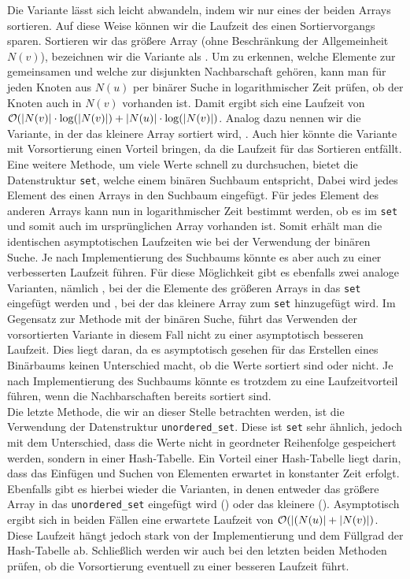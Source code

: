 Die Variante \SorSor{} lässt sich leicht abwandeln, indem wir nur eines der beiden Arrays sortieren.
Auf diese Weise können wir die Laufzeit des einen Sortiervorgangs sparen. Sortieren
wir das größere Array (ohne Beschränkung der Allgemeinheit $N(v)$), bezeichnen wir die Variante als \SorSea{}. Um zu erkennen, 
welche Elemente zur gemeinsamen und welche zur disjunkten Nachbarschaft gehören, kann man für jeden
Knoten aus $N(u)$ per binärer Suche in logarithmischer Zeit prüfen, ob der Knoten auch in $N(v)$ vorhanden ist.
Damit ergibt sich eine Laufzeit von $\mathcal{O}(|N(v)| \cdot \log(|N(v)|) + |N(u)| \cdot \log(|N(v)|)$. Analog dazu
nennen wir die Variante, in der das kleinere Array sortiert wird, \SeaSor. 
Auch hier könnte die Variante mit Vorsortierung einen Vorteil bringen, da die Laufzeit
für das Sortieren entfällt.
\\

Eine weitere Methode, um viele Werte schnell zu durchsuchen, bietet die Datenstruktur \texttt{set}, welche
einem binären Suchbaum entspricht, 
Dabei wird jedes Element des einen Arrays in den Suchbaum eingefügt. 
Für jedes Element des anderen Arrays kann nun in logarithmischer
Zeit bestimmt werden, ob es im \texttt{set} und somit auch im ursprünglichen Array vorhanden ist.
Somit erhält man die identischen asymptotischen Laufzeiten wie bei der Verwendung der
binären Suche. Je nach Implementierung des Suchbaums könnte es aber auch zu einer verbesserten
Laufzeit führen. 
Für diese Möglichkeit gibt es ebenfalls zwei 
analoge Varianten, nämlich \SetSea, bei der die Elemente des größeren Arrays in das \texttt{set} eingefügt werden
und \SeaSet, bei der das kleinere Array zum \texttt{set} hinzugefügt wird.
Im Gegensatz zur Methode mit der binären Suche, führt das Verwenden der vorsortierten Variante in diesem Fall
nicht zu einer asymptotisch besseren Laufzeit. Dies liegt daran, da es asymptotisch
gesehen für das Erstellen eines Binärbaums keinen Unterschied macht, ob die Werte sortiert sind oder nicht.
Je nach Implementierung des Suchbaums könnte es trotzdem zu eine Laufzeitvorteil führen, 
wenn die Nachbarschaften bereits sortiert sind.
\\

Die letzte Methode, die wir an dieser Stelle betrachten werden,
ist die Verwendung der Datenstruktur \texttt{unordered\_set}. Diese ist \texttt{set} sehr ähnlich, jedoch mit
dem Unterschied, dass die Werte nicht in geordneter Reihenfolge gespeichert werden, sondern
in einer Hash-Tabelle. Ein Vorteil einer Hash-Tabelle liegt darin, 
dass das Einfügen und Suchen von Elementen
erwartet in konstanter Zeit erfolgt.
Ebenfalls gibt es hierbei wieder die Varianten, 
in denen entweder das größere Array in das \texttt{unordered\_set} eingefügt wird (\USetSea) 
oder das kleinere (\SeaUSet).{}
Asymptotisch ergibt sich in beiden Fällen eine erwartete Laufzeit von $\mathcal{O}(|(N(u)| + |N(v)|)$.
Diese Laufzeit hängt jedoch stark von der Implementierung und dem Füllgrad  der Hash-Tabelle ab. 
Schließlich werden wir auch bei den letzten beiden Methoden prüfen,
 ob die Vorsortierung eventuell zu einer besseren Laufzeit führt.
\\

